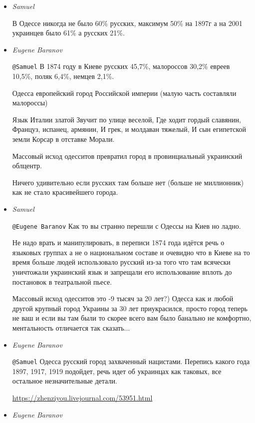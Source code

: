 \begin{itemize}
\begin{itemize}

\item \emph{Samuel}

В Одессе никогда не было 60\% русских, максимум 50\% на 1897г а на 2001 украинцев
было 61\% а русских 21\%.

\item \emph{Eugene Baranov}

\verb|@Samuel|  В 1874 году в Киеве русских 45,7\%, малороссов 30,2\% евреев 10,5\%, поляк 6,4\%, немцев 2,1\%. 

Одесса  европейский город Российской империи (малую часть составляли малороссы) 

\obeycr
	Язык Италии златой 
	Звучит по улице веселой, 
	Где ходит гордый славянин, 
	Француз, испанец, армянин, 
	И грек, и молдаван тяжелый, 
	И сын египетской земли 
	Корсар в отставке Морали.
\restorecr

Массовый исход одесситов превратил город в провинциальный украинский облцентр.

Ничего удивительно если русских там больше нет (больше не миллионник) как не
стало красивейшего города.

\item \emph{Samuel}

\verb|@Eugene Baranov|  Как то вы странно перешли с Одессы на Киев но ладно.

Не надо врать и манипулировать, в переписи 1874 года идётся речь о языковых
группах а не о национальном составе и очевидно что в Киеве на то время больше
людей использовало русский из-за того что там всячески уничтожали украинский
язык и запрещали его использование вплоть до постановок в театральной пьесе. 

Массовый исход одесситов это -9 тысяч за 20 лет?) Одесса как и любой другой
крупный город Украины за 30 лет приукрасился, просто город теперь не ваш и если
вы там были то скорее всего вам было банально не комфортно, ментальность
отличается так сказать...

\item \emph{Eugene Baranov}

\verb|@Samuel|  Одесса русский город захваченный нацистами. Перепись какого
года 1897, 1917, 1919 подойдет, речь идет об украинцах как таковых, все
остальное незначительные  детали.

\url{https://zhenziyou.livejournal.com/53951.html}

\item \emph{Eugene Baranov}


\end{itemize}
\end{itemize}
